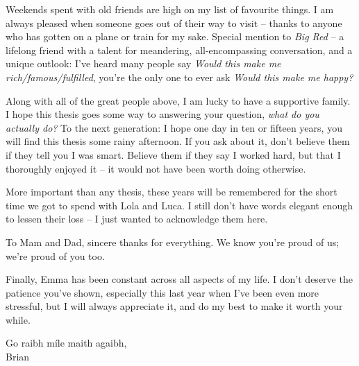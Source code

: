 \par 

Weekends spent with old friends are high on my list of favourite things. 
I am always pleased when someone goes out of their way to visit -- 
    thanks to anyone who has gotten on a plane or train for my sake. 
Special mention to \emph{Big Red} -- a lifelong friend with a talent for 
    meandering, all-encompassing conversation, and a unique outlook:
    I've heard many people say \emph{Would this make me rich/famous/fulfilled}, 
    you're the only one to ever ask \emph{Would this make me happy?}
\par 

Along with all of the great people above, 
    I am lucky to have a supportive family. 
I hope this thesis goes some way to answering your question, 
    \emph{what do you actually do?} 
To the next generation: 
    I hope one day in ten or fifteen years, you will find this thesis some rainy afternoon. 
If you ask about it, don't believe them if they tell you I was smart. 
Believe them if they say I worked hard, but that I thoroughly enjoyed it -- it would not have been worth doing otherwise. 
\par 
More important than any thesis, these years will be remembered for 
    the short time we got to spend with Lola and Luca. 
I still don't have words elegant enough to lessen their loss -- I just wanted to acknowledge them here. 
\par 

To Mam and Dad, sincere thanks for everything. 
We know you're proud of us; 
    we're proud of you too. 
\par 
Finally, Emma has been constant across all aspects of my life.
I don't deserve the patience you've shown, especially this last year when I've been even more stressful, 
    but I will always appreciate it, and do my best to make it worth your while.  

\begin{flushright}
    Go raibh m\'ile maith agaibh, \\
    Brian
\end{flushright}